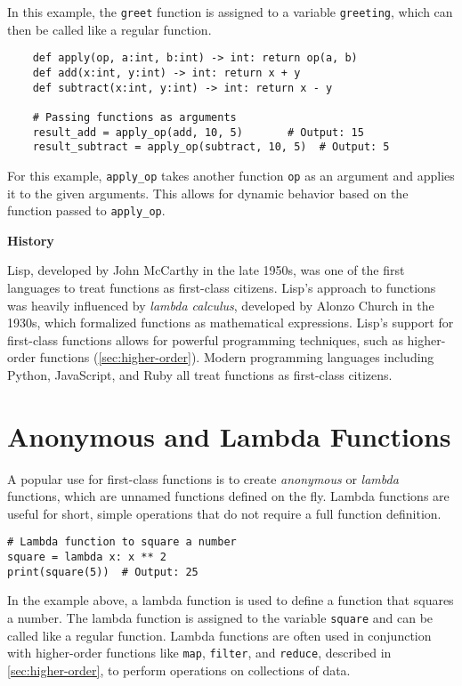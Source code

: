\documentclass[oneside,11pt,dvipsnames]{book}
\newenvironment{historybox}[1][]{
  \small
  \begin{myhistorybox}
    {\small \textbf{#1}}
  }{
  \end{myhistorybox}
}
\newcommand{\code}[1]{\texttt{#1}}
\begin{document}
In this example, the \code{greet} function is assigned to a variable \code{greeting}, which can then be called like a regular function. 

\begin{lstlisting}
    def apply(op, a:int, b:int) -> int: return op(a, b)        
    def add(x:int, y:int) -> int: return x + y        
    def subtract(x:int, y:int) -> int: return x - y        

    # Passing functions as arguments
    result_add = apply_op(add, 10, 5)       # Output: 15
    result_subtract = apply_op(subtract, 10, 5)  # Output: 5
\end{lstlisting}

For this example, \code{apply\_op} takes another function \code{op} as an argument and applies it to the given arguments. This allows for dynamic behavior based on the function passed to \code{apply\_op}.

\begin{historybox}[History]
Lisp, developed by John McCarthy in the late 1950s, was one of the first languages to treat functions as first-class citizens. Lisp's approach to functions was heavily influenced by \emph{lambda calculus}, developed by Alonzo Church in the 1930s, which formalized functions as mathematical expressions. Lisp's support for first-class functions allows for powerful programming techniques, such as higher-order functions (\autoref{sec:higher-order}).  Modern programming languages including Python, JavaScript, and Ruby all treat functions as first-class citizens. 
\end{historybox}

\section{Anonymous and Lambda Functions}\label{sec:lambda}
A popular use for first-class functions is to create \emph{anonymous} or \emph{lambda} functions, which are unnamed functions defined on the fly. Lambda functions are useful for short, simple operations that do not require a full function definition. 
\begin{lstlisting}
# Lambda function to square a number
square = lambda x: x ** 2
print(square(5))  # Output: 25
\end{lstlisting}

In the example above, a lambda function is used to define a function that squares a number. The lambda function is assigned to the variable \code{square} and can be called like a regular function.
Lambda functions are often used in conjunction with higher-order functions like \code{map}, \code{filter}, and \code{reduce}, described in \autoref{sec:higher-order}, to perform operations on collections of data.
\end{document}
